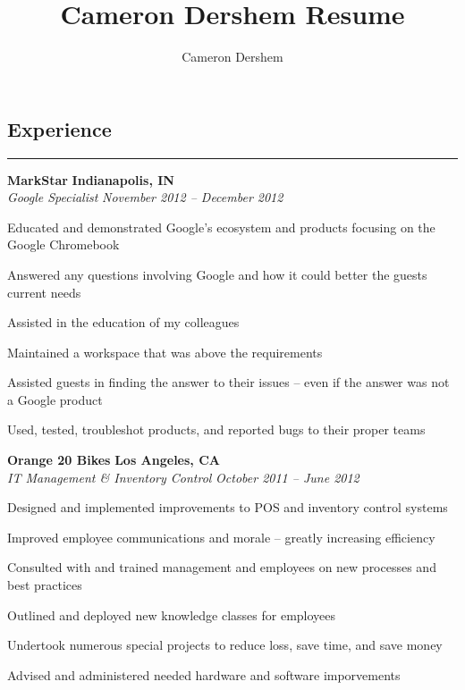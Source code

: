 \documentclass[10pt,letterpaper]{article}			%
\author{Cameron Dershem}							%
\title{Cameron Dershem Resume}						%
\newcommand{\JobHeader}[4]{							%
			\vspace{-.4em}
			\textbf{#1}
			\hfill
			\textbf{#2}
			\\
			\emph{#3}
			\hfill
			\emph{#4}\par
			\vspace{-1em}
			}
\begin{document}

\vspace{-2.4em}
\subsection*{Experience}
\vspace{-.6em}
\hrule
\vspace{0.8em}

	\JobHeader{MarkStar}{Indianapolis, IN}{Google Specialist}{November 2012 -- December 2012}
		\begin{itemize*}
		\item Educated and demonstrated Google's ecosystem and products focusing on the Google Chromebook
		\item Answered any questions involving Google and how it could better the guests current needs
		\item Assisted in the education of my colleagues
		\item Maintained a workspace that was above the requirements
		\item Assisted guests in finding the answer to their issues -- even if the answer was not a Google product
		\item Used, tested, troubleshot products, and reported bugs to their proper teams
		\end{itemize*}

	\JobHeader{Orange 20 Bikes}{Los Angeles, CA}{IT Management \& Inventory Control}{October 2011 -- June 2012}
		\begin{itemize*}	
		\item Designed and implemented improvements to POS and inventory control systems
		\item Improved employee communications and morale -- greatly increasing efficiency
		\item Consulted with and trained management and employees on new processes and best practices
		\item Outlined and deployed new knowledge classes for employees 
		\item Undertook numerous special projects to reduce loss, save time, and save money
		\item Advised and administered needed hardware and software imporvements
		\end{itemize*}
\end{document}
